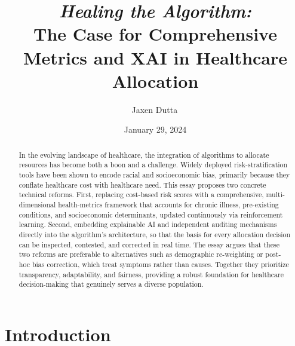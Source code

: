 \documentclass[11pt,showkeys]{essay}
\begin{document}
\title{\textit{Healing the Algorithm:}\\
The Case for Comprehensive Metrics and XAI in Healthcare Allocation}

\author{Jaxen Dutta\, }

\date{January 29, 2024}

\begin{abstract}
In the evolving landscape of healthcare, the integration of algorithms to allocate resources has become both a boon and a challenge. Widely deployed risk-stratification tools have been shown to encode racial and socioeconomic bias, primarily because they conflate healthcare cost with healthcare need. This essay proposes two concrete technical reforms. First, replacing cost-based risk scores with a comprehensive, multi-dimensional health-metrics framework that accounts for chronic illness, pre-existing conditions, and socioeconomic determinants, updated continuously via reinforcement learning. Second, embedding explainable AI and independent auditing mechanisms directly into the algorithm's architecture, so that the basis for every allocation decision can be inspected, contested, and corrected in real time. The essay argues that these two reforms are preferable to alternatives such as demographic re-weighting or post-hoc bias correction, which treat symptoms rather than causes. Together they prioritize transparency, adaptability, and fairness, providing a robust foundation for healthcare decision-making that genuinely serves a diverse population.
\end{abstract}


\maketitle

\section{Introduction}
\end{document}
